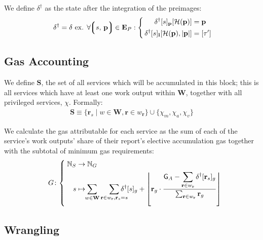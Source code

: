 We define $\delta^\dagger$ as the state after the integration of the preimages:
\begin{align}
    \delta^\dagger = \delta \text{ ex. } \forall \tup{s\ts\mathbf{p}} \in \mathbf{E}_P : \left\{\,\begin{aligned}
      \quad\delta^\dagger[s]_\mathbf{p}[\mathcal{H}(\mathbf{p})] &= \mathbf{p} \\
      \delta^\dagger[s]_\mathbf{l}[\mathcal{H}(\mathbf{p}), |\mathbf{p}|] &= [\tau']
    \end{aligned}\right.\!\!
\end{align}



\subsection{Gas Accounting}

We define $\mathbf{S}$, the set of all services which will be accumulated in this block; this is all services which have at least one work output within $\mathbf{W}$, together with all privileged services, $\chi$. Formally:
\begin{align}\label{eq:servicestoaccumulate}
  \mathbf{S} \equiv \{ \mathbf{r}_s \mid w \in \mathbf{W}, \mathbf{r} \in w_\mathbf{r} \} \cup \{ \chi_m, \chi_a, \chi_v \}
\end{align}

We calculate the gas attributable for each service as the sum of each of the service's work outputs' share of their report's elective accumulation gas together with the subtotal of minimum gas requirements:
\begin{equation}
  G\colon\left\{\;\begin{aligned}
    \N_S &\to \N_G \\
    \displaystyle s &\mapsto \!\!\sum_{w \in \mathbf{W}}\sum_{\mathbf{r} \in w_\mathbf{r} , \mathbf{r}_s = s}{\!\!\!\!\!\!\!\delta^\dagger[s]_g + \left \lfloor \mathbf{r}_g\cdot\frac{\displaystyle \mathsf{G}_A - \sum_{\mathbf{r} \in w_\mathbf{r}}{\delta^\dagger[\mathbf{r}_s]_g}}{\sum_{\mathbf{r} \in w_\mathbf{r}}{\mathbf{r}_g}} \right \rfloor }
  \end{aligned}\right.\!\!\!\!\!\!
\end{equation}

\subsection{Wrangling}

